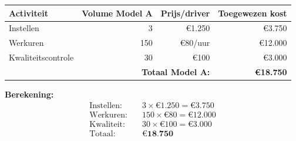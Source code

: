 \documentclass[a4paper,11pt]{article}
\begin{document}
\begin{oefenblok}
\begin{center}
\begin{tabular}{|l|r|r|r|}
\hline
\textbf{Activiteit} & \textbf{Volume Model A} & \textbf{Prijs/driver} & \textbf{Toegewezen kost} \\
\hline
Instellen & 3 & €1.250 & €3.750 \\
\hline
Werkuren & 150 & €80/uur & €12.000 \\
\hline
Kwaliteitscontrole & 30 & €100 & €3.000 \\
\hline
\multicolumn{3}{|r|}{\textbf{Totaal Model A:}} & \textbf{€18.750} \\
\hline
\end{tabular}
\end{center}

\textbf{Berekening:}
\begin{align*}
\text{Instellen:} \quad & 3 \times €1.250 = €3.750 \\
\text{Werkuren:} \quad & 150 \times €80 = €12.000 \\
\text{Kwaliteit:} \quad & 30 \times €100 = €3.000 \\
\hline
\text{Totaal:} \quad & \textbf{€18.750}
\end{align*}

\begin{center}
\end{center}

\end{oefenblok}
\end{document}

